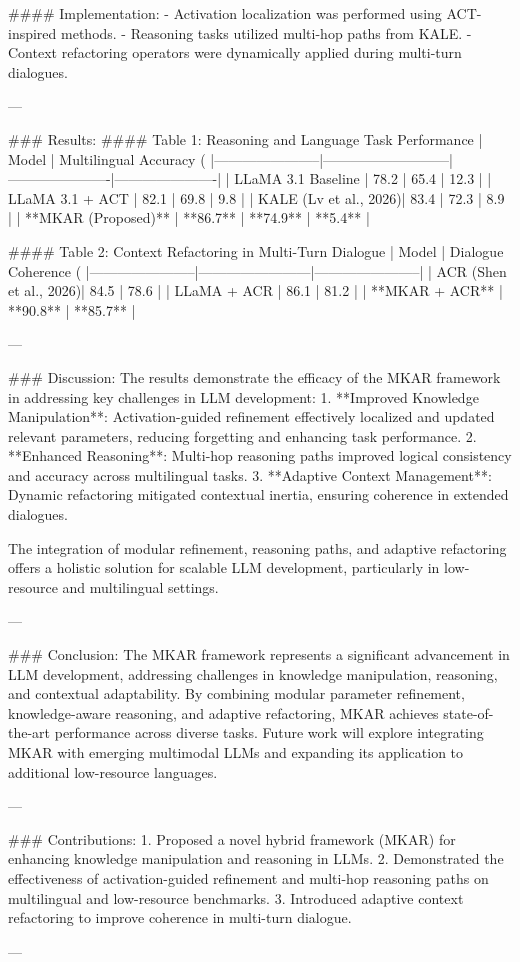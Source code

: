 #### Implementation:
- Activation localization was performed using ACT-inspired methods.
- Reasoning tasks utilized multi-hop paths from KALE.
- Context refactoring operators were dynamically applied during multi-turn dialogues.

---

### Results:
#### Table 1: Reasoning and Language Task Performance
| Model                 | Multilingual Accuracy (%
|-----------------------|---------------------------|----------------------|----------------------|
| LLaMA 3.1 Baseline    | 78.2                     | 65.4                | 12.3                |
| LLaMA 3.1 + ACT       | 82.1                     | 69.8                | 9.8                 |
| KALE (Lv et al., 2026)| 83.4                     | 72.3                | 8.9                 |
| **MKAR (Proposed)**   | **86.7**                 | **74.9**            | **5.4**             |

#### Table 2: Context Refactoring in Multi-Turn Dialogue
| Model                 | Dialogue Coherence (%
|-----------------------|------------------------|-----------------------|
| ACR (Shen et al., 2026)| 84.5                 | 78.6                 |
| LLaMA + ACR           | 86.1                  | 81.2                 |
| **MKAR + ACR**        | **90.8**              | **85.7**             |

---

### Discussion:
The results demonstrate the efficacy of the MKAR framework in addressing key challenges in LLM development:
1. **Improved Knowledge Manipulation**: Activation-guided refinement effectively localized and updated relevant parameters, reducing forgetting and enhancing task performance.
2. **Enhanced Reasoning**: Multi-hop reasoning paths improved logical consistency and accuracy across multilingual tasks.
3. **Adaptive Context Management**: Dynamic refactoring mitigated contextual inertia, ensuring coherence in extended dialogues.

The integration of modular refinement, reasoning paths, and adaptive refactoring offers a holistic solution for scalable LLM development, particularly in low-resource and multilingual settings.

---

### Conclusion:
The MKAR framework represents a significant advancement in LLM development, addressing challenges in knowledge manipulation, reasoning, and contextual adaptability. By combining modular parameter refinement, knowledge-aware reasoning, and adaptive refactoring, MKAR achieves state-of-the-art performance across diverse tasks. Future work will explore integrating MKAR with emerging multimodal LLMs and expanding its application to additional low-resource languages.

---

### Contributions:
1. Proposed a novel hybrid framework (MKAR) for enhancing knowledge manipulation and reasoning in LLMs.
2. Demonstrated the effectiveness of activation-guided refinement and multi-hop reasoning paths on multilingual and low-resource benchmarks.
3. Introduced adaptive context refactoring to improve coherence in multi-turn dialogue.

---